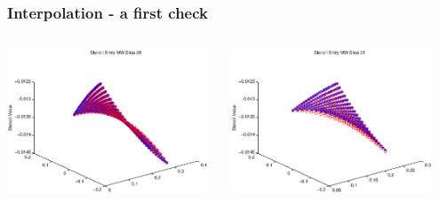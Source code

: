 \documentclass[t,compress=false,usepdftitle=false]{beamer}
\begin{document}
%
%
\begin{frame}\frametitle{Interpolation - a first check}

\begin{columns}[T] 
\begin{column}[T]{4.1cm} 
  \centering
  \includegraphics[width=0.98\textwidth]{stencilMW_slice29}\\
\end{column}\hfill
\begin{column}[T]{4.1cm} 
  \centering
  \includegraphics[width=0.98\textwidth]{stencilMW_slice21}\\
\end{column}\hfill
\begin{column}[T]{4.1cm} 
  \centering

\end{column}
\end{columns}
\end{frame}
\end{document}
